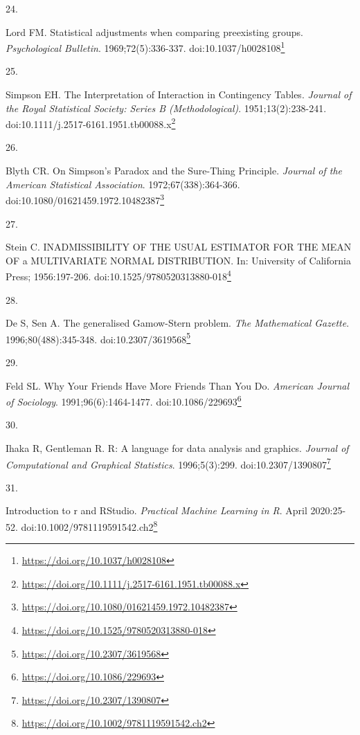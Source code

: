 \documentclass[
  a4paper,
]{book}
\newlength{\cslhangindent}
\newlength{\csllabelwidth}
\newlength{\cslentryspacingunit} %
\newenvironment{CSLReferences}[2] %
 {%
  \setlength{\parindent}{0pt}
  \ifodd #1
  \let\oldpar\par
  \def\par{\hangindent=\cslhangindent\oldpar}
  \fi
  \setlength{\parskip}{#2\cslentryspacingunit}
 }%
 {}
\newcommand{\CSLLeftMargin}[1]{\parbox[t]{\csllabelwidth}{#1}}
\newcommand{\CSLRightInline}[1]{\parbox[t]{\linewidth - \csllabelwidth}{#1}\break}
\renewcommand{\href}[2]{#2\footnote{\url{#1}}}
\begin{document}
\begin{CSLReferences}{0}{0}
\leavevmode{}%
\CSLLeftMargin{24. }%
\CSLRightInline{Lord FM. Statistical adjustments when comparing preexisting groups. \emph{Psychological Bulletin}. 1969;72(5):336-337. doi:\href{https://doi.org/10.1037/h0028108}{10.1037/h0028108}}

\leavevmode{}%
\CSLLeftMargin{25. }%
\CSLRightInline{Simpson EH. The Interpretation of Interaction in Contingency Tables. \emph{Journal of the Royal Statistical Society: Series B (Methodological)}. 1951;13(2):238-241. doi:\href{https://doi.org/10.1111/j.2517-6161.1951.tb00088.x}{10.1111/j.2517-6161.1951.tb00088.x}}

\leavevmode{}%
\CSLLeftMargin{26. }%
\CSLRightInline{Blyth CR. On Simpson's Paradox and the Sure-Thing Principle. \emph{Journal of the American Statistical Association}. 1972;67(338):364-366. doi:\href{https://doi.org/10.1080/01621459.1972.10482387}{10.1080/01621459.1972.10482387}}

\leavevmode{}%
\CSLLeftMargin{27. }%
\CSLRightInline{Stein C. INADMISSIBILITY OF THE USUAL ESTIMATOR FOR THE MEAN OF a MULTIVARIATE NORMAL DISTRIBUTION. In: University of California Press; 1956:197-206. doi:\href{https://doi.org/10.1525/9780520313880-018}{10.1525/9780520313880-018}}

\leavevmode{}%
\CSLLeftMargin{28. }%
\CSLRightInline{De S, Sen A. The generalised Gamow-Stern problem. \emph{The Mathematical Gazette}. 1996;80(488):345-348. doi:\href{https://doi.org/10.2307/3619568}{10.2307/3619568}}

\leavevmode{}%
\CSLLeftMargin{29. }%
\CSLRightInline{Feld SL. Why Your Friends Have More Friends Than You Do. \emph{American Journal of Sociology}. 1991;96(6):1464-1477. doi:\href{https://doi.org/10.1086/229693}{10.1086/229693}}

\leavevmode{}%
\CSLLeftMargin{30. }%
\CSLRightInline{Ihaka R, Gentleman R. R: A language for data analysis and graphics. \emph{Journal of Computational and Graphical Statistics}. 1996;5(3):299. doi:\href{https://doi.org/10.2307/1390807}{10.2307/1390807}}

\leavevmode{}%
\CSLLeftMargin{31. }%
\CSLRightInline{Introduction to r and RStudio. \emph{Practical Machine Learning in R}. April 2020:25-52. doi:\href{https://doi.org/10.1002/9781119591542.ch2}{10.1002/9781119591542.ch2}}


\end{CSLReferences}
\end{document}
